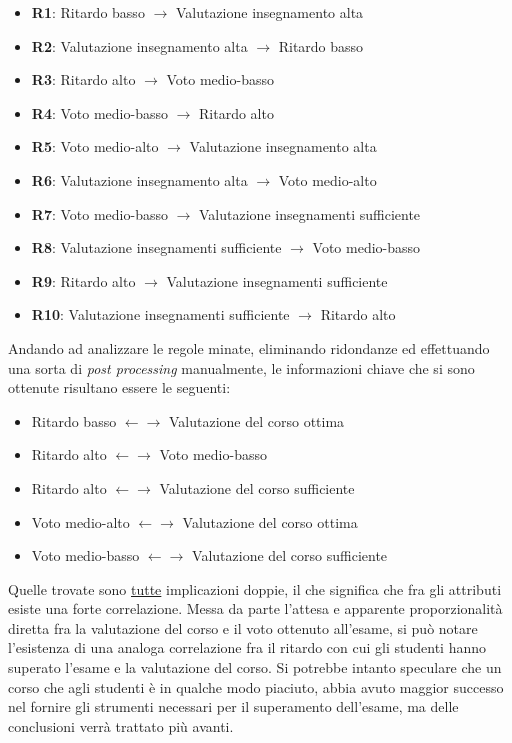             \begin{itemize}
                \item \textbf{R1}: Ritardo basso $\rightarrow$ Valutazione insegnamento alta
                \item \textbf{R2}: Valutazione insegnamento alta $\rightarrow$ Ritardo basso
                \item \textbf{R3}: Ritardo alto $\rightarrow$ Voto medio-basso
                \item \textbf{R4}: Voto medio-basso $\rightarrow$ Ritardo alto
                \item \textbf{R5}: Voto medio-alto $\rightarrow$ Valutazione insegnamento alta
                \item \textbf{R6}: Valutazione insegnamento alta $\rightarrow$ Voto medio-alto
                \item \textbf{R7}: Voto medio-basso $\rightarrow$ Valutazione insegnamenti sufficiente
                \item \textbf{R8}: Valutazione insegnamenti sufficiente $\rightarrow$ Voto medio-basso
                \item \textbf{R9}: Ritardo alto $\rightarrow$ Valutazione insegnamenti sufficiente
                \item \textbf{R10}: Valutazione insegnamenti sufficiente $\rightarrow$ Ritardo alto
            \end{itemize}

            Andando ad analizzare le regole minate, eliminando ridondanze ed effettuando una sorta di \textit{post processing} manualmente, le informazioni chiave che si sono ottenute risultano essere le seguenti:

            \begin{itemize}
                \item Ritardo basso $\leftarrow \rightarrow$ Valutazione del corso ottima
                \item Ritardo alto $\leftarrow \rightarrow$ Voto medio-basso
                \item Ritardo alto $\leftarrow \rightarrow$ Valutazione del corso sufficiente
                \item Voto medio-alto $\leftarrow \rightarrow$ Valutazione del corso ottima
                \item Voto medio-basso $\leftarrow \rightarrow$ Valutazione del corso sufficiente
            \end{itemize}

            Quelle trovate sono \underline{tutte} implicazioni doppie, il che significa che fra gli attributi esiste una forte correlazione. Messa da parte l'attesa e apparente proporzionalità diretta fra la valutazione del corso e il voto ottenuto all'esame, si può notare l'esistenza di una analoga correlazione fra il ritardo con cui gli studenti hanno superato l'esame e la valutazione del corso. Si potrebbe intanto speculare che un corso che agli studenti è in qualche modo piaciuto, abbia avuto maggior successo nel fornire gli strumenti necessari per il superamento dell'esame, ma delle conclusioni verrà trattato più avanti.

